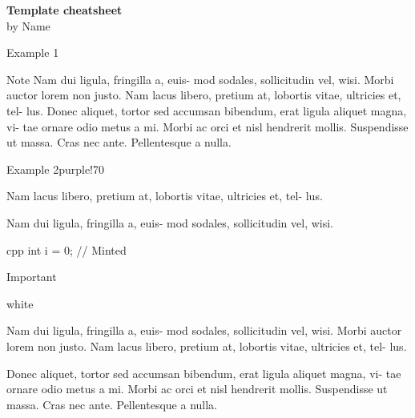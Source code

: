 \documentclass[10pt, a4paper, landscape]{article}
\begin{document}
	
\begin{onehalfspace}
	
	\begin{multicols*}{4}
	
		\begin{flushleft}
			\LARGE{\bf{\textcolor{\mainColor}{\textbf{Template cheatsheet}}}} \\
			\large{by \textcolor{\mainColor}{Name}}
		\end{flushleft}
		
		\begin{Text}{Example 1}
			 \lipsum[1]
			
			\begin{Note}{Note}
				Nam dui ligula, fringilla a, euis-
				mod sodales, sollicitudin vel, wisi. Morbi
				auctor lorem non justo. Nam lacus libero,
				pretium at, lobortis vitae, ultricies et, tel-
				lus.
				 Donec aliquet, tortor sed accumsan
				bibendum, erat ligula aliquet magna, vi-
				tae ornare odio metus a mi. Morbi ac
				orci et nisl hendrerit mollis. Suspendisse
				ut massa. Cras nec ante. Pellentesque
				a nulla. 
			
			\end{Note}
		
			\lipsum[3-4]
		\end{Text}
	
		\begin{TextColor}{Example 2}{purple!70}		
			
			Nam lacus libero,
			pretium at, lobortis vitae, ultricies et, tel-
			lus.
			
			
			Nam dui ligula, fringilla a, euis-
			mod sodales, sollicitudin vel, wisi.
			
			
\begin{CodeMinted}{cpp}
int i = 0; // Minted
\end{CodeMinted}
			
			\begin{Important}{Important}
				
				\begin{List}{white}
					\item Nam dui ligula, fringilla a, euis-
					mod sodales, sollicitudin vel, wisi. Morbi
					auctor lorem non justo.
					Nam lacus libero,
					pretium at, lobortis vitae, ultricies et, tel-
					lus.
					
					\item Donec aliquet, tortor sed accumsan
					bibendum, erat ligula aliquet magna, vi-
					tae ornare odio metus a mi.
					Morbi ac
					orci et nisl hendrerit mollis. Suspendisse
					ut massa. Cras nec ante. Pellentesque
					a nulla.
					

\end{List}
\end{Important}
\end{TextColor}
\end{multicols*}
\end{onehalfspace}
\end{document}
